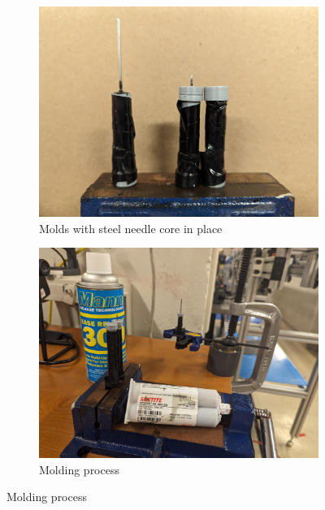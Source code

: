             \begin{figure}[!ht]
                \centering
                \begin{subfigure}[t]{0.30\textwidth}
                    \centering
                    \includegraphics[width=\textwidth]{assets/3 design/Molds.jpg}
                    \caption{Molds with steel needle core in place}
                \end{subfigure}
                \hfill
                \begin{subfigure}[t]{0.30\textwidth}
                    \centering
                    \includegraphics[width=\textwidth]{assets/3 design/Mold process.jpg}
                    \caption{Molding process}
                \end{subfigure}

\end{figure}
